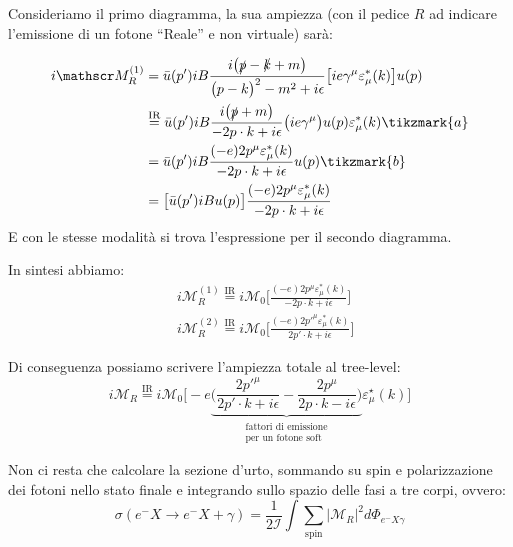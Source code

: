 \documentclass[../main.tex]{subfiles}
\begin{document}
Consideriamo il primo diagramma, la sua ampiezza (con il pedice $R$ ad indicare l'emissione di un fotone “Reale” e non virtuale) sarà:

\begin{align*}
    i\mathscr M_R^{(1)} &= \bar u(p')iB \frac{i\big(\slashed p - \slashed k + m\big)}{\big(p-k\big)^2 -m^2 + i\epsilon}\big[ie\gamma^\mu\varepsilon_\mu^\ast(k)\big]u(p) \\
    &\overset{\text{IR}}{=}\bar u(p')iB \frac{i\big(\slashed p + m\big)}{-2p\cdot k + i\epsilon}\big(ie\gamma^\mu\big)u(p)\varepsilon_\mu^\ast(k)\tikzmark{a}\\
    &=\bar u(p')iB \frac{(-e)2p^\mu\varepsilon_\mu^\ast(k)}{-2p\cdot k + i\epsilon}u(p) \tikzmark{b}\\
    &=\big[\bar u(p')iB u(p)\big]\frac{(-e)2p^\mu\varepsilon_\mu^\ast(k)}{-2p\cdot k + i\epsilon}
\end{align*}
E con le stesse modalità si trova l'espressione per il secondo diagramma. 

In sintesi abbiamo:
\begin{align*}
    &i\mathscr M_R^{(1)} \overset{\text{IR}}{=} i\mathscr M_0\bigg[\frac{(-e)2p^\mu\varepsilon_\mu^\ast(k)}{-2p\cdot k + i\epsilon}\bigg]\\
    &i\mathscr M_R^{(2)} \overset{\text{IR}}{=} i\mathscr M_0\bigg[\frac{(-e)2p'^\mu\varepsilon_\mu^\ast(k)}{2p'\cdot k + i\epsilon}\bigg]
\end{align*}

Di conseguenza possiamo scrivere l'ampiezza totale al tree-level:
\begin{equation}
    \boxed{
    i\mathscr M_R \overset{\text{IR}}{=} i\mathscr M_0\bigg[-e
    \underbrace{\bigg(\frac{2p'^\mu}{2p'\cdot k + i\epsilon} -\frac{2p^\mu}{2p\cdot k - i\epsilon}\bigg)}_{\substack{\text{fattori di emissione}\\\text{per un fotone soft}}}
    \varepsilon^\star_\mu(k)\bigg]}
    \label{eq:total_treelevel_amplitude_realemission}
\end{equation}

Non ci resta che calcolare la sezione d'urto, sommando su spin e polarizzazione dei fotoni nello stato finale e integrando sullo spazio delle fasi a tre corpi, ovvero:
\[
\sigma(e^-X\rightarrow e^-X+\gamma) = \frac{1}{2\mathscr I}\int\sum_{\text{spin}} |\mathscr M_R|^2d\Phi_{e^-X\gamma}
\]
\end{document}
